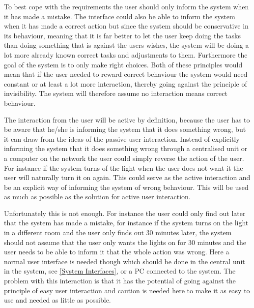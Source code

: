 To best cope with the requirements the user should only inform the system when it has made a mistake. The interface could also be able to inform the system when it has made a correct action but since the system should be conservative in its behaviour, meaning that it is far better to let the user keep doing the tasks than doing something that is against the users wishes, the system will be doing a lot more already known correct tasks and adjustments to them. Furthermore the goal of the system is to only make right choices. Both of these principles would mean that if the user needed to reward correct behaviour the system would need constant or at least a lot more interaction, thereby going against the principle of invisibility. The system will therefore assume no interaction means correct behaviour.

The interaction from the user will be active by definition, because the user has to be aware that he/she is informing the system that it does something wrong, but it can draw from the ideas of the passive user interaction. Instead of explicitly informing the system that it does something wrong through a centralised unit or a computer on the network the user could simply reverse the action of the user. For instance if the system turns of the light when the user does not want it the user will naturally turn it on again. This could serve as the active interaction and be an explicit way of informing the system of wrong behaviour. This will be used as much as possible as the solution for active user interaction. 

Unfortunately this is not enough. For instance the user could only find out later that the system has made a mistake, for instance if the system turns on the light in a different room and the user only finds out 30 minutes later, the system should not assume that the user only wants the lights on for 30 minutes and the user needs to be able to inform it that the whole action was wrong. Here a normal user interface is needed though which should be done in the central unit in the system, see \cref{System Interfaces}, or a PC connected to the system. The problem with this interaction is that it has the potential of going against the principle of easy user interaction and caution is needed here to make it as easy to use and needed as little as possible.